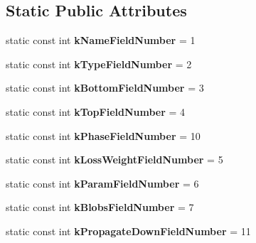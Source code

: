 \subsection*{Static Public Attributes}
\begin{DoxyCompactItemize}
\item 
\mbox{\label{classcaffe_1_1_layer_parameter_a7f804247696d22a5fa773536dd8a6ead}} 
static const int {\bfseries k\+Name\+Field\+Number} = 1
\item 
\mbox{\label{classcaffe_1_1_layer_parameter_a1b7797197916a38e0a09d3cd72c8c4b1}} 
static const int {\bfseries k\+Type\+Field\+Number} = 2
\item 
\mbox{\label{classcaffe_1_1_layer_parameter_a403af44584d252e398e8ac72618b93d6}} 
static const int {\bfseries k\+Bottom\+Field\+Number} = 3
\item 
\mbox{\label{classcaffe_1_1_layer_parameter_ae9d37400cc345c7960f45781289e134f}} 
static const int {\bfseries k\+Top\+Field\+Number} = 4
\item 
\mbox{\label{classcaffe_1_1_layer_parameter_a47edee415aceed6d4c727707f2ad0273}} 
static const int {\bfseries k\+Phase\+Field\+Number} = 10
\item 
\mbox{\label{classcaffe_1_1_layer_parameter_aebd8ad11ddbf8c25b0ffb3ef2fb454b5}} 
static const int {\bfseries k\+Loss\+Weight\+Field\+Number} = 5
\item 
\mbox{\label{classcaffe_1_1_layer_parameter_a0c5c76ecba142ef43e36ce0e638f7460}} 
static const int {\bfseries k\+Param\+Field\+Number} = 6
\item 
\mbox{\label{classcaffe_1_1_layer_parameter_a13d1720c788692683ec8c6e8dd4cdcbc}} 
static const int {\bfseries k\+Blobs\+Field\+Number} = 7
\item 
\mbox{\label{classcaffe_1_1_layer_parameter_a815f27d441aef4109d4604c5bbc271ff}} 
static const int {\bfseries k\+Propagate\+Down\+Field\+Number} = 11

\end{DoxyCompactItemize}
